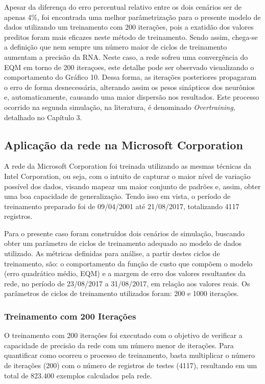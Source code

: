 Apesar da diferença do erro percentual relativo entre os dois cenários ser de apenas 4\%, foi encontrada uma melhor parâmetrização para o presente modelo de dados utilizando um treinamento com 200 iterações, pois a exatidão dos valores preditos foram mais eficazes neste método de treinamento. Sendo assim, chega-se a definição que nem sempre um número maior de ciclos de treinamento aumentam a precisão da RNA. Neste caso, a rede sofreu uma convergência do EQM em torno de 200 iteraçoes, este detalhe pode ser observado visualizando o comportamento do Gráfico 10. Dessa forma, as iterações posteriores propagaram o erro de forma desnecessária, alterando assim os pesos sinápticos dos neurônios e, automaticamente, causando uma maior dispersão nos resultados. Este processo ocorrido na segunda simulação, na literatura, é denominado \textit{Overtraining}, detalhado no Capítulo 3.

\subsection{Aplicação da rede na Microsoft Corporation}
A rede da Microsoft Corporation foi treinada utilizando as mesmas técnicas da Intel Corporation, ou seja, com o intuito de capturar o maior nível de variação possível dos dados, visando mapear um maior conjunto de padrões e, assim, obter uma boa capacidade de generalização. Tendo isso em vista, o período de treinamento preparado foi de 09/04/2001 até 21/08/2017, totalizando 4117 registros.

Para o presente caso foram construídos dois cenários de simulação, buscando obter um parâmetro de ciclos de treinamento adequado ao modelo de dados utilizado. As métricas definidas para análise, a partir destes ciclos de treinamento, são: o comportamento da função de custo que compõem o modelo (erro quadrático médio, EQM) e a margem de erro dos valores resultantes da rede, no período de 23/08/2017 a 31/08/2017, em relação aos valores reais. Os parâmetros de ciclos de treinamento utilizados foram: 200 e 1000 iterações.

\subsubsection{Treinamento com 200 Iterações}	
O treinamento com 200 iterações foi executado com o objetivo de verificar a capacidade de precisão da rede com um número menor de iterações. Para quantificar como ocorreu o processo de treinamento, basta multiplicar o número de iterações (200) com o número de registros de testes (4117), resultando em um total de 823.400 exemplos calculados pela rede.

